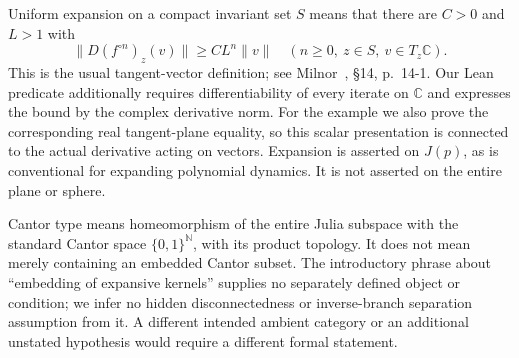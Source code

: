 \documentclass[11pt]{article}
\newcommand{\C}{\mathbb C}
\newcommand{\N}{\mathbb N}
\newcommand{\J}{J}
\begin{document}
Uniform expansion on a compact invariant set $S$ means that there are
$C>0$ and $L>1$ with
\[
 \|D(f^{\circ n})_z(v)\|\ge C L^n\|v\|
 \quad(n\ge0,\ z\in S,\ v\in T_z\C).
\]
This is the usual tangent-vector definition; see Milnor~\cite{milnor},
\S14, p.~14-1. Our Lean predicate additionally requires differentiability of
every iterate on $\C$ and expresses the bound by the complex derivative norm.
For the example we also prove the corresponding real tangent-plane equality,
so this scalar presentation is connected to the actual derivative acting on
vectors. Expansion is asserted on $\J(p)$, as is conventional for expanding
polynomial dynamics. It is not asserted on the entire plane or sphere.

Cantor type means homeomorphism of the entire Julia subspace with the standard
Cantor space $\{0,1\}^{\N}$, with its product topology. It does not mean merely
containing an embedded Cantor subset. The introductory phrase about
``embedding of expansive kernels'' supplies no separately defined object or
condition; we infer no hidden disconnectedness or inverse-branch separation
assumption from it. A different intended ambient category or an additional
unstated hypothesis would require a different formal statement.
\end{document}

